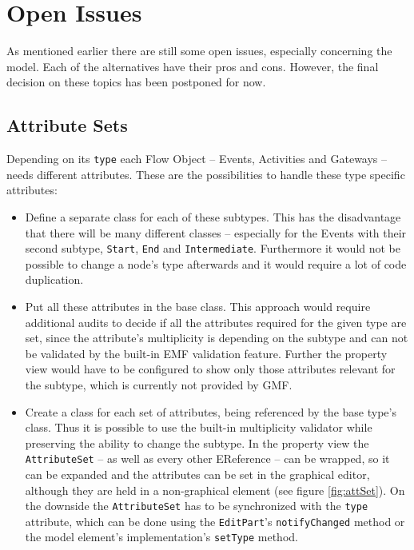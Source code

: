 \section{Open Issues}
\label{sec:open_issues}

As mentioned earlier there are still some open issues, especially concerning the model. Each of the alternatives have their pros and cons. However, the final decision on these topics has been postponed for now.


\subsection{Attribute Sets}

Depending on its \verb|type| each Flow Object -- Events, Activities and Gateways -- needs different attributes. These are the possibilities to handle these type specific attributes:

\begin{itemize}
        \item Define a separate class for each of these subtypes. This has the disadvantage that there will be many different classes -- especially for the Events with their second subtype, \verb|Start|, \verb|End| and \verb|Intermediate|. Furthermore it would not be possible to change a node's type afterwards and it would require a lot of code duplication.
        \item Put all these attributes in the base class. This approach would require additional audits to decide if all the attributes required for the given type are set, since the attribute's multiplicity is depending on the subtype and can not be validated by the built-in EMF validation feature. Further the property view would have to be configured to show only those attributes relevant for the subtype, which is currently not provided by GMF.
        \item Create a class for each set of attributes, being referenced by the base type's class. Thus it is possible to use the built-in multiplicity validator while preserving the ability to change the subtype. In the property view the \verb|AttributeSet| -- as well as every other EReference -- can be wrapped, so it can be expanded and the attributes can be set in the graphical editor, although they are held in a non-graphical element (see figure \ref{fig:attSet}). On the downside the \verb|AttributeSet| has to be synchronized with the \verb|type| attribute, which can be done using the \verb|EditPart|'s \verb|notifyChanged| method or the model element's implementation's \verb|setType| method.
\end{itemize}

